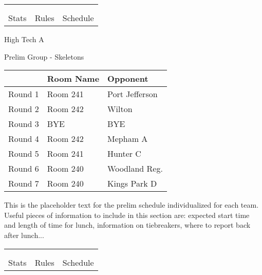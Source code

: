 \documentclass{article}%
\begin{document}
\vspace*{30pt}%
\newline%
%
\begin{tabularx}{\textwidth}{YYY}%
  &  &  \\%
\\%
Stats&Rules&Schedule\\%
\end{tabularx}%
\newpage%
%
\begin{center}%
\begin{Huge}%
High Tech A%
\end{Huge}%
\vspace*{12pt}%
\linebreak%
\begin{Large}%
Prelim Group {-} Skeletons%
\end{Large}%
\end{center}%
\vspace*{4pt}%
\begin{tabularx}{\textwidth}{|c|Y|Y|}%
\hline%
&Room Name&Opponent\\%
\hline%
Round 1&Room 241&Port Jefferson\\%
Round 2&Room 242&Wilton\\%
Round 3&BYE&BYE\\%
Round 4&Room 242&Mepham A\\%
Round 5&Room 241&Hunter C\\%
Round 6&Room 240&Woodland Reg.\\%
Round 7&Room 240&Kings Park D\\%
\hline%
\end{tabularx}%
\vspace*{30pt}%
\linebreak%
This is the placeholder text for the prelim schedule individualized for each team. Useful pieces of information to include in this section are: expected start time and length of time for lunch, information on tiebreakers, where to report back after lunch...%
\vspace*{30pt}%
\newline%
%
\begin{tabularx}{\textwidth}{YYY}%
  &  &  \\%
\\%
Stats&Rules&Schedule\\%
\end{tabularx}%
\end{document}

